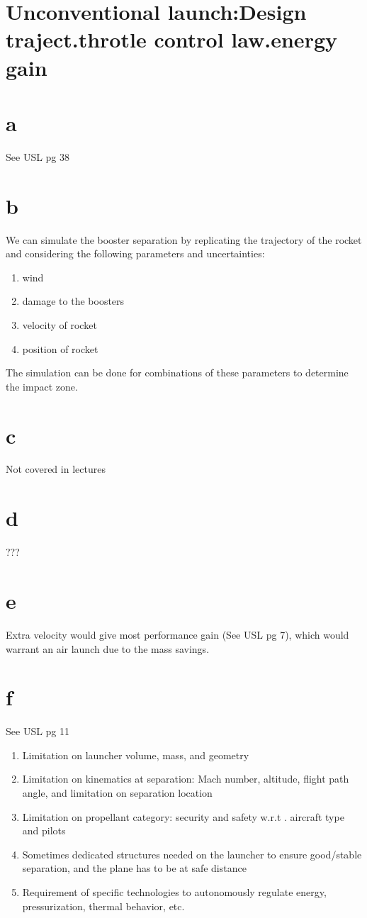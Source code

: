 \section{ Unconventional launch:Design traject.throtle control law.energy gain }\label{sec:q3}  

\section*{a}
See USL pg 38

\section*{b}
We can simulate the booster separation by replicating the trajectory of the rocket and considering the following parameters and uncertainties:

\begin{enumerate}
    \item wind
    \item damage to the boosters
    \item velocity of rocket 
    \item position of rocket
\end{enumerate}

The simulation can be done for combinations of these parameters to determine the impact zone.

\section*{c}
Not covered in lectures

\section*{d}
???


\section*{e}
Extra velocity would give most performance gain (See USL pg 7), which would warrant an air launch due to the mass savings.


\section*{f}
See USL pg 11
\begin{enumerate}
    \item Limitation on launcher volume, mass, and geometry 
    \item Limitation on kinematics at separation: Mach number, altitude, flight path angle, and limitation on separation location 
    \item  Limitation on propellant category: security and safety w.r.t   . aircraft type and pilots 
    \item  Sometimes dedicated structures needed on the launcher to ensure good/stable separation, and the plane has to be at safe distance 
    \item  Requirement of specific technologies to autonomously regulate energy, pressurization, thermal behavior, etc.
\end{enumerate}